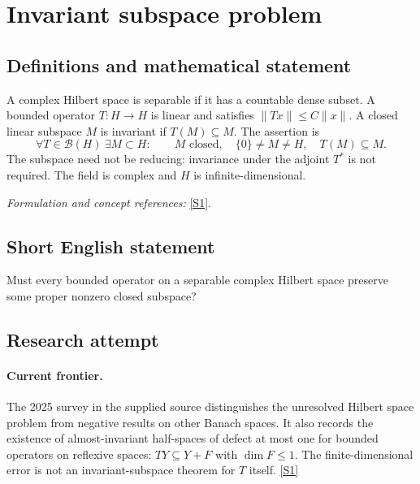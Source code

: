 \documentclass[11pt,a4paper]{article}
\newcommand{\sref}[2]{\hyperlink{source:#1:#2}{[S#2]}}
\newif\ifshowcatalogue
\newcommand{\cataloguescope}[1]{\ifshowcatalogue
 \paragraph{Exact scope in the supplied catalogue.}
 \begin{quote}\small #1\end{quote}\fi}
\numberwithin{equation}{section}
\begin{document}
\setcounter{section}{0}
\clearpage
\section*{\texorpdfstring{Invariant subspace problem}{Invariant subspace problem}}\label{3034}
\subsection{Definitions and mathematical statement}
A complex Hilbert space is separable if it has a countable dense subset. A bounded operator $T:H\to H$ is linear and satisfies $\|Tx\|\le C\|x\|$. A closed linear subspace $M$ is invariant if $T(M)\subseteq M$. The assertion is
\[
 \forall T\in\mathcal B(H)\ \exists M\subset H:\qquad
 M\text{ closed},\quad\{0\}\ne M\ne H,\quad T(M)\subseteq M.
\]
The subspace need not be reducing: invariance under the adjoint $T^*$ is not required. The field is complex and $H$ is infinite-dimensional.
\par\smallskip\textit{Formulation and concept references:} \sref{3034}{1}.
\cataloguescope{Does every bounded linear operator T on an infinite-dimensional separable complex Hilbert space H have a nontrivial closed invariant subspace, that is, a closed subspace M with \{0\} != M != H such that T(M) is a subset of M?}
\subsection{Short English statement}
Must every bounded operator on a separable complex Hilbert space preserve some proper nonzero closed subspace?
\subsection{Research attempt}

\paragraph{Current frontier.}
The 2025 survey in the supplied source distinguishes the unresolved Hilbert
space problem from negative results on other Banach spaces. It also records
the existence of almost-invariant half-spaces of defect at most one for
bounded operators on reflexive spaces: $TY\subseteq Y+F$ with
$\dim F\leq1$. The finite-dimensional error is not an invariant-subspace
theorem for $T$ itself. \sref{3034}{1}
\end{document}
